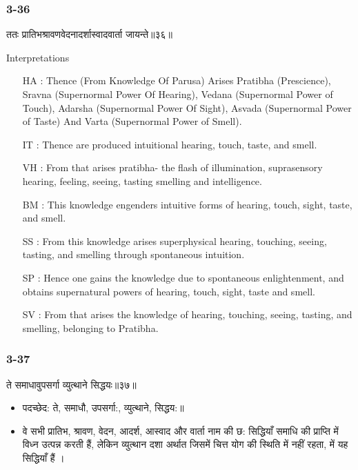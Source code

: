 \begin{frame}[fragile]\frametitle{3-36}
\begin{sanskrit}
ततः प्रातिभश्रावणवेदनादर्शास्वादवार्ता जायन्ते॥३६॥
\end{sanskrit}

Interpretations
\begin{itemize}	
\item [HA]: Thence (From Knowledge Of Parusa) Arises Pratibha (Prescience), Sravna (Supernormal Power Of Hearing), Vedana (Supernormal Power of Touch), Adarsha (Supernormal Power Of Sight), Asvada (Supernormal Power of Taste) And Varta (Supernormal Power of Smell).
\item [IT]: Thence are produced intuitional hearing, touch, taste, and smell.
\item [VH]: From that arises pratibha- the flash of illumination, suprasensory hearing, feeling, seeing, tasting smelling and intelligence.
\item [BM]: This knowledge engenders intuitive forms of hearing, touch, sight, taste, and smell.
\item [SS]: From this knowledge arises superphysical hearing, touching, seeing, tasting, and smelling through spontaneous intuition.
\item [SP]: Hence one gains the knowledge due to spontaneous enlightenment, and obtains supernatural powers of hearing, touch, sight, taste and smell.
\item [SV]: From that arises the knowledge of hearing, touching, seeing, tasting, and smelling, belonging to Pratibha. 
\end{itemize}
\end{frame}

\begin{frame}[fragile]\frametitle{3-37}
\begin{sanskrit}
ते समाधावुपसर्गा व्युत्थाने सिद्धयः॥३७॥
\end{sanskrit}

\begin{itemize}
\item पदच्छेद:  ते, समाधौ, उपसर्गा:, व्युत्थाने, सिद्धय:॥
\item वे सभी प्रातिभ, श्रावण, वेदन, आदर्श, आस्वाद और वार्ता नाम की छ: सिद्धियाँ समाधि की प्राप्ति में विध्न उत्पन्न करती हैं, लेकिन व्युत्थान दशा अर्थात जिसमें चित्त योग की स्थिति में नहीं रहता, में यह सिद्धियाँ हैं ।
\end{itemize}
\end{frame}


